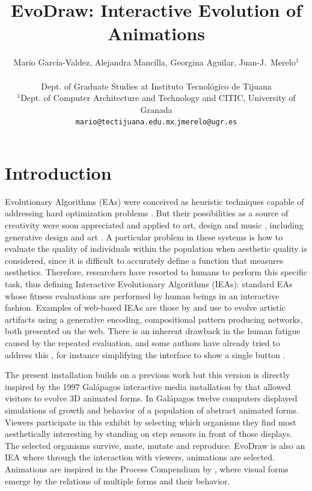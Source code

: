 \documentclass[letterpaper]{article}
\title{EvoDraw: Interactive Evolution of Animations}
\author{ Mario Garc\'ia-Valdez, Alejandra Mancilla, Georgina Aguilar, Juan-J.~Merelo$^1$\\
\mbox{}\\
Dept. of Graduate Studies at Instituto Tecnol\'ogico de Tijuana \\
$^1$Dept. of Computer Architecture and Technology and CITIC, 
University of Granada \\
{\tt mario@tectijuana.edu.mx},{\tt jmerelo@ugr.es}}
\begin{document}
\maketitle


\section{Introduction} 

Evolutionary Algorithms (EAs) were conceived as heuristic techniques 
capable of addressing hard optimization problems 
\citep{DBLP:books/daglib/0015527}. But their possibilities as a source of
creativity were soon appreciated and applied to art, design and music \citep{ie1}, including generative design and
art \citep{Bentley:1999:intro,Sims:1991,todd:1992}.  A particular problem in
these systems is how to evaluate the quality of individuals within the population
when aesthetic quality is considered, since it is difficult to
accurately define a function that measures aesthetics. Therefore, researchers
have resorted to humans to perform this specific task, thus defining Interactive
Evolutionary Algorithms (IEAs): standard EAs whose fitness evaluations are
performed by human beings in an interactive fashion. Examples of web-based IEAs are
those by \cite{picbreeder} and \cite{forms}
use  to evolve artistic artifacts using a generative encoding, compositional
pattern producing networks, both presented on the web.
There is an inherent drawback in the human fatigue caused by the repeated evaluation, and some authors have
already tried to address this \citep{Frade:2010:EvoGAMES}, for instance simplifying the interface to show a single button \citep{davies2016evolving}. %

The present installation builds on a previous work \citep{garcia2013evospace}
but this version is directly inspired by the 1997 Galápagos interactive 
media installation by \cite{galapagos} that allowed visitors to evolve 3D animated forms. 
In Gal{\'a}pagos twelve computers displayed simulations of growth and 
behavior of a population of abstract animated forms. Viewers
participate in this exhibit by selecting which organisms they find
most aesthetically interesting by standing on step sensors in front 
of those displays. The selected organisms survive, mate, mutate and 
reproduce. EvoDraw is also an IEA where through the interaction
with viewers, animations are selected. Animations are inspired in 
the Process Compendium by \cite{reas:2004}, where visual forms 
emerge by the relations of multiple forms and their behavior. 
\end{document}
